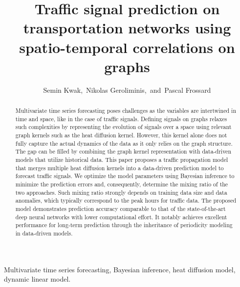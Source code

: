 \documentclass[journal]{IEEEtran}
\begin{document}
\title{Traffic signal prediction on transportation networks using spatio-temporal correlations on graphs}


\author{Semin Kwak,~Nikolas Geroliminis,~and~Pascal Frossard}
















\maketitle
\begin{abstract}
Multivariate time series forecasting poses challenges as the variables are intertwined in time and space, like in the case of traffic signals. Defining signals on graphs relaxes such complexities by representing the evolution of signals over a space using relevant graph kernels such as the heat diffusion kernel. However, this kernel alone does not fully capture the actual dynamics of the data as it only relies on the graph structure. The gap can be filled by combining the graph kernel representation with data-driven models that utilize historical data. This paper proposes a traffic propagation model that merges multiple heat diffusion kernels into a data-driven prediction model to forecast traffic signals. We optimize the model parameters using Bayesian inference to minimize the prediction errors and, consequently, determine the mixing ratio of the two approaches. Such mixing ratio strongly depends on training data size and data anomalies, which typically correspond to the peak hours for traffic data. The proposed model demonstrates prediction accuracy comparable to that of the state-of-the-art deep neural networks with lower computational effort. It notably achieves excellent performance for long-term prediction through the inheritance of periodicity modeling in data-driven models.

\end{abstract}

\begin{IEEEkeywords}
Multivariate time series forecasting, Bayesian inference, heat diffusion model, dynamic linear model.
\end{IEEEkeywords}






\IEEEpeerreviewmaketitle
\end{document}
